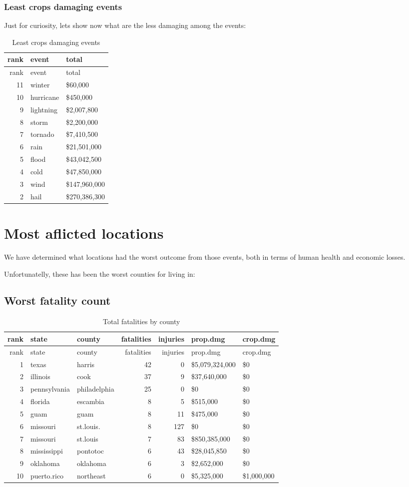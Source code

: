 \documentclass[]{article}
\begin{document}
\subsubsection{Least crops damaging
events}\label{least-crops-damaging-events}

Just for curiosity, lets show now what are the less damaging among the
events:

\begin{longtable}[]{@{}rll@{}}
\caption{Least crops damaging events}\tabularnewline
\toprule
rank & event & total\tabularnewline
\midrule
\endfirsthead
\toprule
rank & event & total\tabularnewline
\midrule
\endhead
11 & winter & \$60,000\tabularnewline
10 & hurricane & \$450,000\tabularnewline
9 & lightning & \$2,007,800\tabularnewline
8 & storm & \$2,200,000\tabularnewline
7 & tornado & \$7,410,500\tabularnewline
6 & rain & \$21,501,000\tabularnewline
5 & flood & \$43,042,500\tabularnewline
4 & cold & \$47,850,000\tabularnewline
3 & wind & \$147,960,000\tabularnewline
2 & hail & \$270,386,300\tabularnewline
\bottomrule
\end{longtable}

\section{Most aflicted locations}\label{most-aflicted-locations}

We have determined what locations had the worst outcome from those
events, both in terms of human health and economic losses.

Unfortunatelly, these has been the worst counties for living in:

\subsection{Worst fatality count}\label{worst-fatality-count}

\begin{longtable}[]{@{}rllrrll@{}}
\caption{Total fatalities by county}\tabularnewline
\toprule
rank & state & county & fatalities & injuries & prop.dmg &
crop.dmg\tabularnewline
\midrule
\endfirsthead
\toprule
rank & state & county & fatalities & injuries & prop.dmg &
crop.dmg\tabularnewline
\midrule
\endhead
1 & texas & harris & 42 & 0 & \$5,079,324,000 & \$0\tabularnewline
2 & illinois & cook & 37 & 9 & \$37,640,000 & \$0\tabularnewline
3 & pennsylvania & philadelphia & 25 & 0 & \$0 & \$0\tabularnewline
4 & florida & escambia & 8 & 5 & \$515,000 & \$0\tabularnewline
5 & guam & guam & 8 & 11 & \$475,000 & \$0\tabularnewline
6 & missouri & st.louis. & 8 & 127 & \$0 & \$0\tabularnewline
7 & missouri & st.louis & 7 & 83 & \$850,385,000 & \$0\tabularnewline
8 & mississippi & pontotoc & 6 & 43 & \$28,045,850 & \$0\tabularnewline
9 & oklahoma & oklahoma & 6 & 3 & \$2,652,000 & \$0\tabularnewline
10 & puerto.rico & northeast & 6 & 0 & \$5,325,000 &
\$1,000,000\tabularnewline
\bottomrule
\end{longtable}
\end{document}
